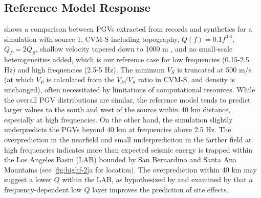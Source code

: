 \subsection{Reference Model Response}
 shows a comparison between PGVs extracted from records and synthetics for a simulation with source 1, CVM-S including topography, $Q(f)=0.1f^{0.6}$, $Q_P=2Q_S$, shallow velocity tapered down to 1000 m \citep{huCalibrationNearsurfaceSeismic2021}, and no small-scale heterogeneities added, which is our reference case for low frequencies (0.15-2.5 Hz) and high frequencies (2.5-5 Hz). The minimum $V_S$ is truncated at 500 m/s (at which $V_P$ is calculated from the $V_P/V_S$ ratio in CVM-S, and density is unchanged), often necessitated by limitations of computational resources. While the overall PGV distributions are similar, the reference model tends to predict larger values to the south and west of the source within 40 km distance, especially at high frequencies. On the other hand, the simulation slightly underpredicts the PGVs beyond 40 km at frequencies above 2.5 Hz. The overprediction in the nearfield and small underprediciton in the farther field at high frequencies indicates more than expected seismic energy is trapped within the Los Angeles Basin (LAB) bounded by San Bernardino and Santa Ana Mountains (see \cref{fig:highf-2}a for location). The overprediction within 40 km may suggest a lower $Q$ within the LAB, as hypothesized by \citet{houghAttenuationAnzaCalifornia1988} and examined by \citet{withersValidationDeterministicBroadband2019} that a frequency-dependent low $Q$ layer improves the prediction of site effects.


